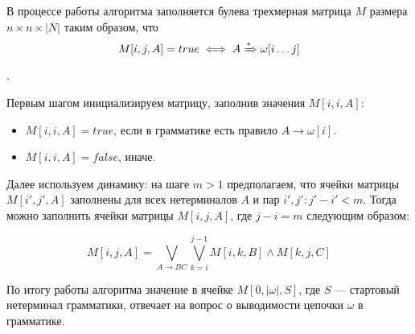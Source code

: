 В процессе работы алгоритма заполняется булева трехмерная матрица $M$ размера $n \times n \times  |N|$ таким образом, что $$M[i, j, A] = true \iff A \xRightarrow[]{*} \omega[i \dots j]$$.

Первым шагом инициализируем матрицу, заполнив значения $M[i, i, A]$:

\begin{itemize}
  \item $M[i, i, A] = true \text{, если в грамматике есть правило } A \to \omega[i]$.
  \item $M[i, i, A] = false$, иначе.
\end{itemize}

Далее используем динамику: на шаге $m > 1$ предполагаем, что ячейки матрицы $M[i', j', A]$ заполнены для всех нетерминалов $A$ и пар $i', j': j' - i' < m$.
Тогда можно заполнить ячейки матрицы $M[i, j, A] \text{, где } j - i = m$ следующим образом:

\[ M[i, j, A] = \bigvee_{A \to B C}^{}{\bigvee_{k=i}^{j-1}{M[i, k, B] \wedge M[k, j, C]}} \]

По итогу работы алгоритма значение в ячейке $M[0, |\omega|, S]$, где $S$ --- стартовый нетерминал грамматики, отвечает на вопрос о выводимости цепочки $\omega$ в грамматике.

